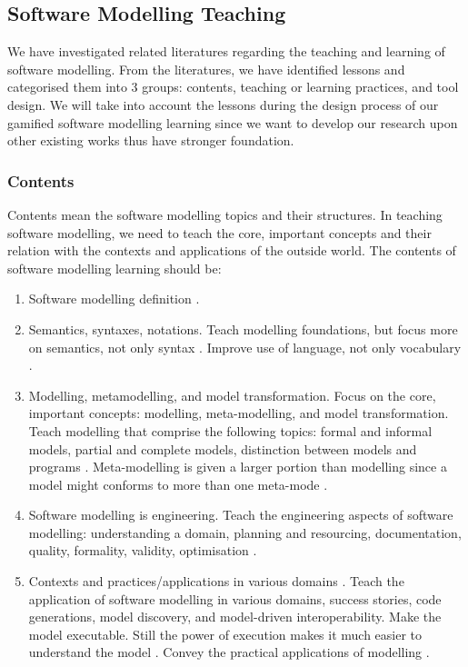 \documentclass[12pt, a4paper]{report}
\begin{document}
\subsection{Software Modelling Teaching}
\label{Software Modelling Teaching}
We have investigated related literatures regarding the teaching and learning of software modelling.  From the literatures, we have identified lessons and categorised them into 3 groups: contents, teaching or learning practices, and tool design. We will take into account the lessons during the design process of our gamified software modelling learning since we want to develop our research upon other existing works thus have stronger foundation.   

\subsubsection{Contents}
Contents mean the software modelling topics and their structures. In teaching software modelling, we need to teach the core, important concepts and their relation with the contexts and applications of the outside world. The contents of software modelling learning should be:
\begin{enumerate}
\item Software modelling definition \cite{borstler2012teaching}.
\item Semantics, syntaxes, notations. Teach modelling foundations, but focus more on semantics, not only syntax \cite{borstler2012teaching}. Improve use of language, not only vocabulary \cite{bezivin2009teaching}.
\item Modelling, metamodelling, and model transformation. Focus on the core, important concepts: modelling, meta-modelling, and model transformation. Teach modelling that comprise the following topics: formal and informal models, partial and complete models, distinction between models and programs \cite{bezivin2009teaching}. Meta-modelling is given a larger portion than modelling since a model might conforms to more than one meta-mode \cite{ober2007teaching}.
\item Software modelling is engineering. Teach the engineering aspects of software modelling: understanding a domain, planning and resourcing, documentation, quality, formality, validity, optimisation \cite{paige2014bad}.
\item Contexts and practices/applications in various domains \cite{paige2014bad}. Teach the application of software modelling in various domains, success stories, code generations, model discovery, and model-driven interoperability. Make the model executable. Still the power of execution makes it much easier to understand the model \cite{bezivin2009teaching}. Convey the practical applications of modelling \cite{borstler2012teaching}.
\end{enumerate}
\end{document}
